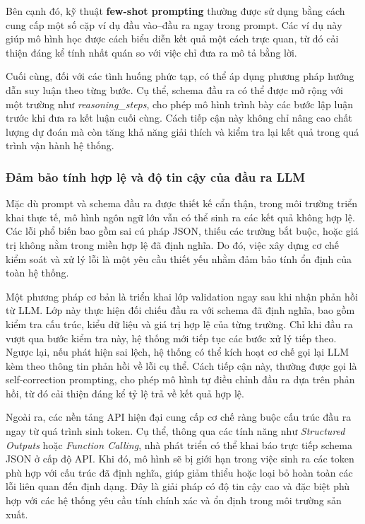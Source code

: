 Bên cạnh đó, kỹ thuật \textbf{few-shot prompting} thường được sử dụng bằng cách cung cấp một số cặp ví dụ đầu vào–đầu ra ngay trong prompt. Các ví dụ này giúp mô hình học được cách biểu diễn kết quả một cách trực quan, từ đó cải thiện đáng kể tính nhất quán so với việc chỉ đưa ra mô tả bằng lời.

Cuối cùng, đối với các tình huống phức tạp, có thể áp dụng phương pháp hướng dẫn suy luận theo từng bước. Cụ thể, schema đầu ra có thể được mở rộng với một trường như \textit{reasoning\_steps}, cho phép mô hình trình bày các bước lập luận trước khi đưa ra kết luận cuối cùng. Cách tiếp cận này không chỉ nâng cao chất lượng dự đoán mà còn tăng khả năng giải thích và kiểm tra lại kết quả trong quá trình vận hành hệ thống.

\subsubsection*{Đảm bảo tính hợp lệ và độ tin cậy của đầu ra LLM}
Mặc dù prompt và schema đầu ra được thiết kế cẩn thận, trong môi trường triển khai thực tế, mô hình ngôn ngữ lớn vẫn có thể sinh ra các kết quả không hợp lệ. Các lỗi phổ biến bao gồm sai cú pháp JSON, thiếu các trường bắt buộc, hoặc giá trị không nằm trong miền hợp lệ đã định nghĩa. Do đó, việc xây dựng cơ chế kiểm soát và xử lý lỗi là một yêu cầu thiết yếu nhằm đảm bảo tính ổn định của toàn hệ thống.

Một phương pháp cơ bản là triển khai lớp validation ngay sau khi nhận phản hồi từ LLM. Lớp này thực hiện đối chiếu đầu ra với schema đã định nghĩa, bao gồm kiểm tra cấu trúc, kiểu dữ liệu và giá trị hợp lệ của từng trường. Chỉ khi đầu ra vượt qua bước kiểm tra này, hệ thống mới tiếp tục các bước xử lý tiếp theo. Ngược lại, nếu phát hiện sai lệch, hệ thống có thể kích hoạt cơ chế gọi lại LLM kèm theo thông tin phản hồi về lỗi cụ thể. Cách tiếp cận này, thường được gọi là self-correction prompting, cho phép mô hình tự điều chỉnh đầu ra dựa trên phản hồi, từ đó cải thiện đáng kể tỷ lệ trả về kết quả hợp lệ.

Ngoài ra, các nền tảng API hiện đại cung cấp cơ chế ràng buộc cấu trúc đầu ra ngay từ quá trình sinh token. Cụ thể, thông qua các tính năng như \textit{Structured Outputs} hoặc \textit{Function Calling}, nhà phát triển có thể khai báo trực tiếp schema JSON ở cấp độ API. Khi đó, mô hình sẽ bị giới hạn trong việc sinh ra các token phù hợp với cấu trúc đã định nghĩa, giúp giảm thiểu hoặc loại bỏ hoàn toàn các lỗi liên quan đến định dạng. Đây là giải pháp có độ tin cậy cao và đặc biệt phù hợp với các hệ thống yêu cầu tính chính xác và ổn định trong môi trường sản xuất.


